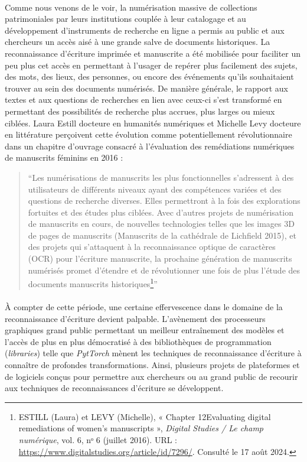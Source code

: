 \documentclass[a4paper,12pt,twoside]{book}
\begin{document}
\paragraph{}
Comme nous venons de le voir, la numérisation massive de collections patrimoniales par leurs institutions couplée à leur catalogage et au développement d’instruments de recherche en ligne a permis au public et aux chercheurs un accès aisé à une grande salve de documents historiques. La reconnaissance d’écriture imprimée et manuscrite a été mobilisée pour faciliter un peu plus cet accès en permettant à l’usager de repérer plus facilement des sujets, des mots, des lieux, des personnes, ou encore des événements qu’ils souhaitaient trouver au sein des documents numérisés. De manière générale, le rapport aux textes et aux questions de recherches en lien avec ceux-ci s’est transformé en permettant des possibilités de recherche plus accrues, plus larges ou mieux ciblées. Laura Estill docteure en humanités numériques et Michelle Levy docteure en littérature perçoivent cette évolution comme potentiellement révolutionnaire dans un chapitre d’ouvrage consacré à l'évaluation des remédiations numériques de manuscrits féminins en 2016 : 
\begin{quote}\enquote{Les numérisations de manuscrits les plus fonctionnelles s'adressent à des utilisateurs de différents niveaux ayant des compétences variées et des questions de recherche diverses. Elles permettront à la fois des explorations fortuites et des études plus ciblées. Avec d'autres projets de numérisation de manuscrits en cours, de nouvelles technologies telles que les images 3D de pages de manuscrits (Manuscrits de la cathédrale de Lichfield 2015), et des projets qui s'attaquent à la reconnaissance optique de caractères (OCR) pour l'écriture manuscrite, la prochaine génération de manuscrits numérisés promet d'étendre et de révolutionner une fois de plus l'étude des documents manuscrits historiques\footnote{\textsc{ESTILL} (Laura) et \textsc{LEVY} (Michelle), « Chapter 12Evaluating digital remediations of women’s manuscripts », \emph{Digital Studies / Le champ numérique}, vol. 6, nᵒ 6 (juillet 2016). URL : \url{https://www.digitalstudies.org/article/id/7296/}. Consulté le 17 août 2024.}}\end{quote}

\paragraph{}
À compter de cette période, une certaine effervescence dans le domaine de la reconnaissance d'écriture devient palpable. L'avènement des processeurs graphiques grand public permettant un meilleur entraînement des modèles et l'accès de plus en plus démocratisé à des bibliothèques de programmation (\textit{libraries}) telle que \textit{PytTorch} mènent les techniques de reconnaissance d'écriture à connaître de profondes transformations. Ainsi, plusieurs projets de plateformes et de logiciels conçus pour permettre aux chercheurs ou au grand public de recourir aux techniques de reconnaissances d'écriture se développent.
\end{document}
